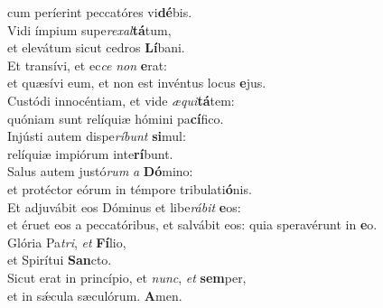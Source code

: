 \evenverse cum períerint peccatóres vi\textbf{dé}bis.\\
\oddverse Vidi ímpium supe\textit{re}\textit{xal}\textbf{tá}tum,~\*\\
\oddverse et elevátum sicut cedros \textbf{Lí}bani.\\
\evenverse Et transívi, et ec\textit{ce} \textit{non} \textbf{e}rat:~\*\\
\evenverse et quæsívi eum, et non est invéntus locus \textbf{e}jus.\\
\oddverse Custódi innocéntiam, et vide \textit{æ}\textit{qui}\textbf{tá}tem:~\*\\
\oddverse quóniam sunt relíquiæ hómini pa\textbf{cí}fico.\\
\evenverse Injústi autem dispe\textit{rí}\textit{bunt} \textbf{si}mul:~\*\\
\evenverse relíquiæ impiórum inte\textbf{rí}bunt.\\
\oddverse Salus autem justó\textit{rum} \textit{a} \textbf{Dó}mino:~\*\\
\oddverse et protéctor eórum in témpore tribulati\textbf{ó}nis.\\
\evenverse Et adjuvábit eos Dóminus et libe\textit{rá}\textit{bit} \textbf{e}os:~\*\\
\evenverse et éruet eos a peccatóribus, et salvábit eos: quia speravérunt in \textbf{e}o.\\
\oddverse Glória Pa\textit{tri}, \textit{et} \textbf{Fí}lio,~\*\\
\oddverse et Spirítui \textbf{San}cto.\\
\evenverse Sicut erat in princípio, et \textit{nunc}, \textit{et} \textbf{sem}per,~\*\\
\evenverse et in sǽcula sæculórum. \textbf{A}men.\\
